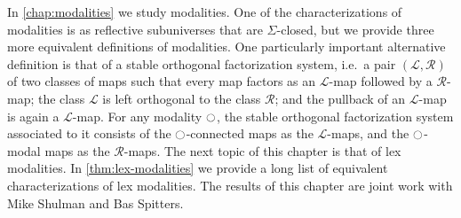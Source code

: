 In \cref{chap:modalities} we study modalities. One of the characterizations of modalities is as reflective subuniverses that are $\Sigma$-closed, but we provide three more equivalent definitions of modalities. One particularly important alternative definition is that of a stable orthogonal factorization system, i.e.~a pair $(\mathcal{L},\mathcal{R})$ of two classes of maps such that every map factors as an $\mathcal{L}$-map followed by a $\mathcal{R}$-map; the class $\mathcal{L}$ is left orthogonal to the class $\mathcal{R}$; and the pullback of an $\mathcal{L}$-map is again a $\mathcal{L}$-map. For any modality ${\ocircle}$, the stable orthogonal factorization system associated to it consists of the ${\ocircle}$-connected maps as the $\mathcal{L}$-maps, and the ${\ocircle}$-modal maps as the $\mathcal{R}$-maps. The next topic of this chapter is that of lex modalities. In \cref{thm:lex-modalities} we provide a long list of equivalent characterizations of lex modalities. The results of this chapter are joint work with Mike Shulman and Bas Spitters.

